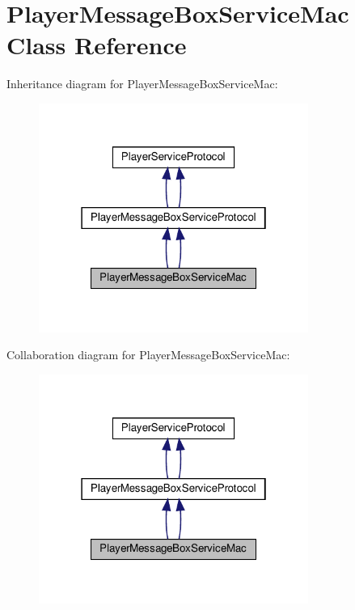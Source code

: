 \hypertarget{classPlayerMessageBoxServiceMac}{}\section{Player\+Message\+Box\+Service\+Mac Class Reference}
\label{classPlayerMessageBoxServiceMac}


Inheritance diagram for Player\+Message\+Box\+Service\+Mac\+:
\nopagebreak
\begin{figure}[H]
\begin{center}
\leavevmode
\includegraphics[width=250pt]{classPlayerMessageBoxServiceMac__inherit__graph}
\end{center}
\end{figure}


Collaboration diagram for Player\+Message\+Box\+Service\+Mac\+:
\nopagebreak
\begin{figure}[H]
\begin{center}
\leavevmode
\includegraphics[width=250pt]{classPlayerMessageBoxServiceMac__coll__graph}
\end{center}
\end{figure}
